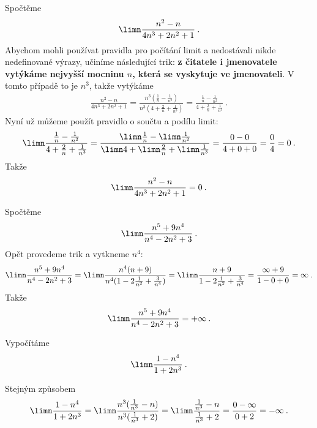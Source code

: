\begin{example}
    Spočtěme 
    \begin{align}
        \limn \frac{n^2-n}{4n^3 + 2n^2 + 1} \:.
    \end{align}
    Abychom mohli používat pravidla pro počítání limit a nedostávali nikde nedefinované výrazy, učiníme následující trik: \textbf{z čitatele i jmenovatele vytýkáme nejvyšší mocninu $n$, která se vyskytuje ve jmenovateli}. V tomto případě to je $n^3$, takže vytýkáme
    \begin{align}
        \frac{n^2-n}{4n^3 + 2n^2 + 1} = \frac{n^3 (\frac{1}{n} - \frac{1}{n^2})}{n^3 (4 + \frac{2}{n} + \frac{1}{n^3})} = \frac{\frac{1}{n} - \frac{1}{n^2}}{4 + \frac{2}{n} + \frac{1}{n^3}}\:.
    \end{align}
    Nyní už můžeme použít pravidlo o součtu a podílu limit:
    \begin{align}
        \limn \frac{\frac{1}{n} - \frac{1}{n^2}}{4 + \frac{2}{n} + \frac{1}{n^3}}
        = \frac{\limn \frac{1}{n} - \limn \frac{1}{n^2}}{\limn 4 + \limn \frac{2}{n} + \limn \frac{1}{n^3}} = \frac{0- 0}{4 + 0 + 0} = \frac{0}{4} = 0 \:.
    \end{align}
    Takže
    \begin{align}
        \limn \frac{n^2-n}{4n^3 + 2n^2 + 1} = 0\:.
    \end{align}
\end{example}

\begin{example}
    Spočtěme
    \begin{align}
        \limn \frac{n^5+ 9 n^4}{n^4 - 2n^2 + 3} \:.
    \end{align}
    Opět provedeme trik a vytkneme $n^4$:
    \begin{align}
        \limn \frac{n^5+ 9 n^4}{n^4 - 2n^2 + 3} =
        \limn \frac{n^4(n + 9)}{n^4(1 - 2 \frac{1}{n^2} + \frac{3}{n^4})} =
        \limn \frac{n + 9}{1 - 2 \frac{1}{n^2} + \frac{3}{n^4}}
        =
        \frac{\infty + 9}{1 - 0 + 0} = \infty \:.
    \end{align}
    Takže
    \begin{align}
        \limn \frac{n^5+ 9 n^4}{n^4 - 2n^2 + 3} = + \infty \:.
    \end{align}
\end{example}

\begin{example}
    Vypočítáme
    \begin{align}
        \limn \frac{1-n^4}{1+2n^3} \:.
    \end{align}

    Stejným způsobem
    \begin{align}
        \limn \frac{1-n^4}{1+2n^3} = \limn \frac{n^3(\frac{1}{n^3}-n)}{n^3(\frac{1}{n^3}+2)}
        =
        \limn \frac{\frac{1}{n^3}-n}{\frac{1}{n^3}+2}
        =
        \frac{0-\infty}{0 + 2} = - \infty \:.
    \end{align}
\end{example}

